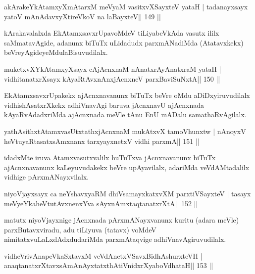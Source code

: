 \begin{shl}
akArakeYkAtamxyXmAtarxM meVyaM vasitxvXSayxteV yataH |
tadanayxsayx yatoV mAnAdavxyXtireVkoV na laBayxteV\hfill || 149 ||
\end{shl}

\begin{artha}
kArakavalalxda EkAtamxsavxrUpavoMdeV tiLiyabeVkAda vasutx ililx saMmatavAgide, adanunx biTuTx uLidadudx parxmANadiMda (Atatavxkekx) beVreyAgideyeMdu\break laBisuvudilalx.
\end{artha}

\begin{shl}
muketxvXYkAtamxyXsayx cAjAcnxnaM nAnatxrAyAnatxraM yataH |
vidhitanatxrXsayx kAyaRtAvxnAnxjAcnxneV parxBaviSuNxtA\hfill || 150 ||
\end{shl}

\begin{artha}
EkAtamxsavxrUpakekx ajAcnxnavanunx biTuTx beVre oMdu aDiDxyiruvudilalx vidhishAsatxrXkekx adhiVnavAgi baruva jAcnxnavU ajAcnxnada kAyaRvAdadxriMda ajAcnxnada meVle tAnu EnU mADalu samathaRvAgilalx.
\end{artha}

\begin{shl}
yathAsithxtAtamxvasUtxtathxjAcnxnaM mukAtxvX tamoVhunxtw |
nAnoyxV heVtuyaRtasatxsAmxnanx tarxyayxnetxV vidhi parxmA\hfill || 151 ||
\end{shl}

\begin{artha}
idadxMte iruva Atamxvasutxvalilx huTuTxva jAcnxnavanunx biTuTx ajAcnxnavanunx kaLeyuvudakekx beVre upAyavilalx, adariMda veVdAMtadalilx vidhige pArxmANayxvilalx.
\end{artha}

\begin{shl}
niyoVjayxsayx ca neYshavxyaRM dhiVsamayxkatxvXM parxtiVSayxteV |
tasayx meVyeYkaheVtutAvxnenxYva sAyxnAmxtaqtanatxrXtA\hfill || 152 ||
\end{shl}

\begin{artha}
matutx niyoVjayxnige jAcnxnada pArxmANayxvanunx kuritu (adara meVle) parxButavxviradu, adu tiLiyuva (tatavx) voMdeV nimitatxvuLaLxdAdxdudariMda parxmAtaqvige adhiVnavAgiruvudilalx.
\end{artha}


\begin{shl}
vidheVrivAnapeVkaSxtavxM veVdAnetxVSavxBidhAshurxteVH |
anaqtanatxrXtavxsAmAnAyxtatxthA\s tiVnidxrXyaboVdhataH\hfill || 153 ||
\end{shl}

